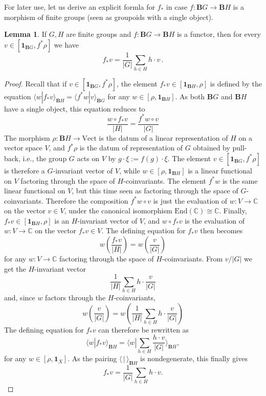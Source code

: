 \documentclass[12pt]{scrartcl}
\theoremstyle{definition}
\newtheorem{lemma}[definition]{Lemma}
\numberwithin{equation}{section}
\numberwithin{definition}{section}
\numberwithin{figure}{section}
\begin{document}
For  later use, let us derive an explicit formla for $f_*$ in case $f\colon \mathbf{B}G\to \mathbf{B}H$ is a morphism of finite groups (seen as groupoids with a single object).

\begin{lemma}
\label{lem:pushonBG}
If $G,H$ are finite groups and $f\colon \mathbf{B}G\to \mathbf{B}H$ is a functor, then for every $v\in [\mathbf{1}_{\mathbf{B}G},f^*\rho]$ we have 
$$
f_*v=\frac{1}{|G|}\sum_{h\in H} h\cdot v \, . 
$$
\end{lemma}

\begin{proof}
Recall that  if $v\in [\mathbf{1}_{\mathbf{B}G},f^*\rho]$, the element $f_*v\in [\mathbf{1}_{\mathbf{B}H},\rho]$ is defined by the equation $\langle w| f_*v\rangle_{\mathbf{B}H} = \langle f^*w| v\rangle_{\mathbf{B}G}$
for any $w\in [\rho,\mathbf{1}_{\mathbf{B}H}]$. As both $\mathbf{B}G$ and $\mathbf{B}H$ have a single object, this equation reduces to
\[
\frac{w\circ f_*v}{|H|}=\frac{f^*w\circ v}{|G|}
\] 
The morphism $\rho\colon \mathbf{B}H\to \mathrm{Vect}$ is the datum of a linear representation of $H$ on a vector space $V$, and $f^*\rho$ is the datum of representation of $G$ obtained by pull-back, i.e., the group $G$ acts on $V$ by $g\cdot \xi := f(g)\cdot \xi$. The element $v\in [\mathbf{1}_{\mathbf{B}G},f^*\rho]$ is therefore a $G$-invariant vector of $V$, while $w\in [\rho,\mathbf{1}_{\mathbf{B}H}]$ is a linear functional on $V$ factoring through the space of $H$-coinvariants. The element $f^*w$ is the same linear functional on $V$, but this time seen as factoring through the space of $G$-coinvariants. Therefore the composition $f^*w\circ v$ is just the evaluation of $w\colon V\to \mathbb{C}$ on the vector $v\in V$, under the canonical isomorphism $\mathrm{End}(\mathbb{C})\cong \mathbb{C}$. Finally, $f_*v\in  [\mathbf{1}_{\mathbf{B}H},\rho]$ is an $H$-invariant vector of $V$, and $w\circ f_*v$ is the evaluation of $w\colon V\to \mathbb{C}$ on the vector $f_*v\in V$. The defining equation for $f_*v$ then becomes
\[
w\left(\frac{f_*v}{|H|}\right)=w\left(\frac{v}{|G|}\right)
\] 
for any $w\colon V\to \mathbb{C}$ factoring through the space of $H$-coinvariants.
From $v/|G|$ we get the $H$-invariant vector 
\[
\frac{1}{|H|}\sum_{h\in H}h\cdot \frac{v}{|G|}
\]
and, since $w$ factors through the $H$-coinvariants,
\[
w\left(\frac{v}{|G|}\right)=w\left(\frac{1}{|H|}\sum_{h\in H}h\cdot \frac{v}{|G|}\right)
\]
The defining equation for $f_*v$ can therefore be rewritten as
\[
\langle w| f_*v\rangle_{\mathbf{B}H}=\langle w| \sum_{h\in H}\frac{h\cdot v}{|G|}\rangle_{\mathbf{B}H},
\]
for any $w\in [\rho,\mathbf{1}_X]$. As the pairing $\langle \,| \,\rangle_{\mathbf{B}H}$ is nondegenerate, this finally gives
\[
f_*v=\frac{1}{|G|}\sum_{h\in H} h\cdot v.
\] 
\end{proof}
\end{document}
